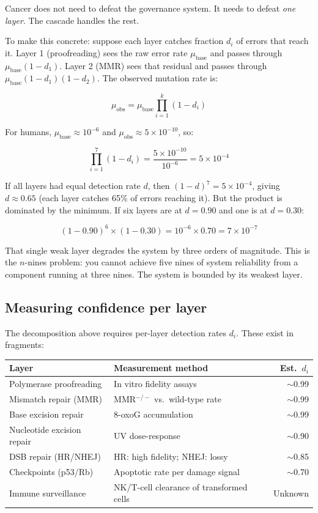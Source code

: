 \documentclass[11pt]{article}
\theoremstyle{definition}
\begin{document}
Cancer does not need to defeat the governance system. It needs to
defeat \emph{one layer}. The cascade handles the rest.

To make this concrete: suppose each layer catches fraction $d_i$ of
errors that reach it. Layer 1 (proofreading) sees the raw error rate
$\mu_{\text{base}}$ and passes through $\mu_{\text{base}}(1 - d_1)$.
Layer 2 (MMR) sees that residual and passes through
$\mu_{\text{base}}(1-d_1)(1-d_2)$. The observed mutation rate is:

\[
\mu_{\text{obs}} = \mu_{\text{base}} \prod_{i=1}^{k} (1 - d_i)
\]

For humans, $\mu_{\text{base}} \approx 10^{-6}$ and
$\mu_{\text{obs}} \approx 5 \times 10^{-10}$, so:

\[
\prod_{i=1}^{7} (1-d_i) = \frac{5 \times 10^{-10}}{10^{-6}}
= 5 \times 10^{-4}
\]

If all layers had equal detection rate $d$, then $(1-d)^7 = 5 \times
10^{-4}$, giving $d \approx 0.65$ (each layer catches 65\% of errors
reaching it). But the product is dominated by the minimum. If six
layers are at $d = 0.90$ and one is at $d = 0.30$:

\[
(1 - 0.90)^6 \times (1 - 0.30) = 10^{-6} \times 0.70
= 7 \times 10^{-7}
\]

That single weak layer degrades the system by three orders of
magnitude. This is the $n$-nines problem: you cannot achieve five
nines of system reliability from a component running at three nines.
The system is bounded by its weakest layer.

\subsection{Measuring confidence per layer}

The decomposition above requires per-layer detection rates $d_i$.
These exist in fragments:

\begin{center}
\small
\begin{tabular}{llr}
\toprule
\textbf{Layer} & \textbf{Measurement method} & \textbf{Est.\ $d_i$} \\
\midrule
Polymerase proofreading & In vitro fidelity assays & $\sim$0.99 \\
Mismatch repair (MMR) & MMR$^{-/-}$ vs.\ wild-type rate & $\sim$0.99 \\
Base excision repair & 8-oxoG accumulation & $\sim$0.99 \\
Nucleotide excision repair & UV dose-response & $\sim$0.90 \\
DSB repair (HR/NHEJ) & HR: high fidelity; NHEJ: lossy & $\sim$0.85 \\
Checkpoints (p53/Rb) & Apoptotic rate per damage signal & $\sim$0.70 \\
Immune surveillance & NK/T-cell clearance of transformed cells & Unknown \\
\bottomrule
\end{tabular}
\end{center}
\end{document}
